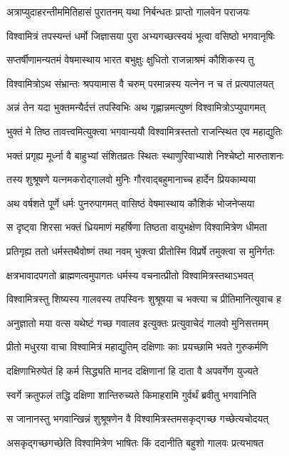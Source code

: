 \twolineshloka
{अत्राप्युदाहरन्तीममितिहासं पुरातनम्}
{यथा निर्बन्धतः प्राप्तो गालवेन पराजयः}


\twolineshloka
{विश्वामित्रं तपस्यन्तं धर्मो जिज्ञासया पुरा}
{अभ्यगच्छत्स्वयं भूत्वा वसिष्ठो भगवानृषिः}


\twolineshloka
{सप्तर्षीणामन्यतमं वेषमास्थाय भारत}
{बभुक्षुः क्षुधितो राजन्नाश्रमं कौशिकस्य तु}


\twolineshloka
{विश्वामित्रोऽथ संभ्रान्तः श्रपयामास वै चरुम्}
{परमान्नस्य यत्नेन न च तं प्रत्यपालयत्}


\twolineshloka
{अन्नं तेन यदा भुक्तमन्यैर्दत्तं तपस्विभिः}
{अथ गृह्णान्नमत्युष्णं विश्वामित्रोऽप्युपागमत्}


\twolineshloka
{भुक्तं मे तिष्ठ तावत्त्वमित्युक्त्वा भगवान्ययौ}
{विश्वामित्रस्ततो राजन्स्थित एव महाद्युतिः}


\twolineshloka
{भक्तं प्रगृह्य मूर्ध्ना वै बाहुभ्यां संशितव्रतः}
{स्थितः स्थाणुरिवाभ्याशे निश्चेष्टो मारुताशनः}


\twolineshloka
{तस्य शुश्रूषणे यत्नमकरोद्गालवो मुनिः}
{गौरवाद्बहुमानाच्च हार्देन प्रियकाम्यया}


\twolineshloka
{अथ वर्षशते पूर्णे धर्मः पुनरुपागमत्}
{वासिष्ठं वेषमास्थाय कौशिकं भोजनेप्सया}


\twolineshloka
{स दृष्ट्वा शिरसा भक्तं ध्रियमाणं महर्षिणा}
{तिष्ठता वायुभक्षेण विश्वामित्रेण धीमता}


\twolineshloka
{प्रतिगृह्य ततो धर्मस्तथैवोष्णं तथा नवम्}
{भुक्त्वा प्रीतोस्मि विप्रर्षे तमुक्त्वा स मुनिर्गतः}


\twolineshloka
{क्षत्रभावादपगतो ब्राह्मणत्वमुपागतः}
{धर्मस्य वचनात्प्रीतो विश्वामित्रस्तथाऽभवत्}


\twolineshloka
{विश्वामित्रस्तु शिष्यस्य गालवस्य तपस्विनः}
{शुश्रूषया च भक्त्या च प्रीतिमानित्युवाच ह}


\twolineshloka
{अनुज्ञातो मया वत्स यथेष्टं गच्छ गवालव}
{इत्युक्तः प्रत्युवाचेदं गालवो मुनिसत्तमम्}


\twolineshloka
{प्रीतो मधुरया वाचा विश्वामित्रं महाद्युतिम्}
{दक्षिणाः काः प्रयच्छामि भवते गुरुकर्मणि}


\twolineshloka
{दक्षिणाभिरुपेतं हि कर्म सिद्ध्यति मानद}
{दक्षिणानां हि दाता वै अपवर्गेण युज्यते}


\twolineshloka
{स्वर्गे क्रतुफलं तद्धि दक्षिणा शान्तिरुच्यते}
{किमाहरामि गुर्वर्थं ब्रवीतु भगवानिति}


\twolineshloka
{स जानानस्तु भगवान्खिन्नं शुश्रूषणेन वै}
{विश्वामित्रस्तमसकृद्गच्छ गच्छेत्यचोदयत्}


\twolineshloka
{असकृद्गच्छगच्छेति विश्वामित्रेण भाषितः}
{किं ददानीति बहुशो गालवः प्रत्यभाषत}


